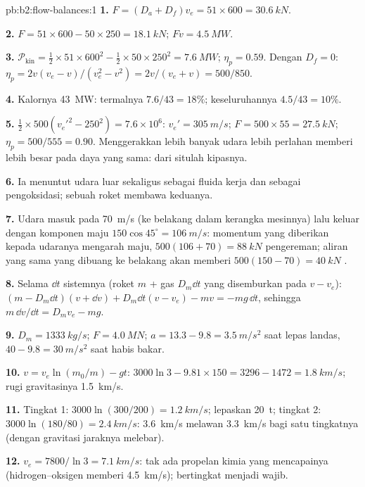 \begin{solution}{pb:b2:flow-balances:1}
\textbf{1.} $F = (D_a + D_f)v_e = 51 \times 600 = \qty{30.6}{kN}$.

\textbf{2.} $F = 51 \times 600 - 50 \times 250 = \qty{18.1}{kN}$; $Fv = \qty{4.5}{MW}$.

\textbf{3.} $\mathcal P_{\text{kin}} = \tfrac12 \times 51 \times 600^2 - \tfrac12 \times 50 \times 250^2 =
\qty{7.6}{MW}$; $\eta_p = 0.59$. Dengan $D_f = 0$: $\eta_p = 2v(v_e - v)/(v_e^2 - v^2)
= 2v/(v_e + v) = 500/850$.

\textbf{4.} Kalornya \qty{43}{MW}: termalnya $7.6/43 = 18\%$; keseluruhannya $4.5/43 = 10\%$.

\textbf{5.} $\tfrac12 \times 500(v_e'^2 - 250^2) = 7.6 \times 10^6$: $v_e' = \qty{305}{m/s}$;
$F = 500 \times 55 = \qty{27.5}{kN}$; $\eta_p = 500/555 = 0.90$. Menggerakkan lebih banyak udara lebih
perlahan memberi  lebih besar pada daya yang sama: dari situlah kipasnya.

\textbf{6.} Ia menuntut udara luar sekaligus sebagai fluida kerja dan sebagai
pengoksidasi; sebuah roket membawa keduanya.

\textbf{7.} Udara masuk pada \qty{70}{m/s} (ke belakang dalam kerangka mesinnya)
lalu keluar dengan komponen maju $150\cos45^\circ = \qty{106}{m/s}$:
momentum yang diberikan kepada udaranya mengarah maju, $500(106 + 70) = \qty{88}{kN}$
pengereman; aliran yang sama yang dibuang ke belakang akan memberi $500(150 - 70) =
\qty{40}{kN}$ .

\textbf{8.} Selama $\dd t$ sistemnya (roket $m$ + gas $D_m\dd t$ yang disemburkan pada
$v - v_e$): $(m - D_m\dd t)(v + \dd v) + D_m\dd t(v - v_e) - mv = -mg\,\dd t$,
sehingga $m\,\dd v/\dd t = D_mv_e - mg$.

\textbf{9.} $D_m = \qty{1333}{kg/s}$; $F = \qty{4.0}{MN}$; $a = 13.3 - 9.8 =
\qty{3.5}{m/s^2}$ saat lepas landas, $40 - 9.8 = \qty{30}{m/s^2}$ saat habis bakar.

\textbf{10.} $v = v_e\ln(m_0/m) - gt$: $3000\ln3 - 9.81 \times 150 = 3296 - 1472 =
\qty{1.8}{km/s}$; rugi gravitasinya \qty{1.5}{km/s}.

\textbf{11.} Tingkat 1: $3000\ln(300/200) = \qty{1.2}{km/s}$; lepaskan \qty{20}{t}; tingkat
2: $3000\ln(180/80) = \qty{2.4}{km/s}$: \qty{3.6}{km/s} melawan \qty{3.3}{km/s}
bagi satu tingkatnya (dengan gravitasi jaraknya melebar).

\textbf{12.} $v_e = 7800/\ln3 = \qty{7.1}{km/s}$: tak ada propelan kimia
yang mencapainya (hidrogen--oksigen memberi \qty{4.5}{km/s}); bertingkat menjadi wajib.


\end{solution}
